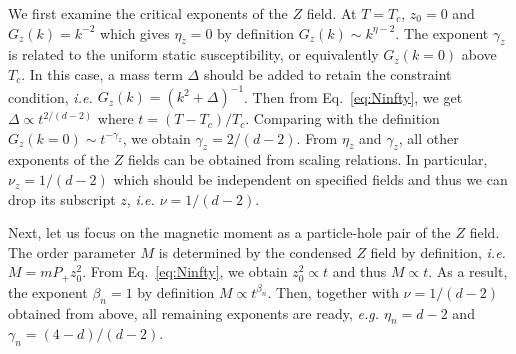 \documentclass[aps,twocolumn,superscriptaddress]{revtex4-1}
\newcommand{\ie}{\textit{i.e.{ }}}
\newcommand{\eg}{\textit{e.g.{ }}}
\begin{document}
We first examine the critical exponents of the $Z$ field. At $T=T_c$, $z_0=0$ and $G_z(k)=k^{-2}$ which gives $\eta_z=0$
by definition $G_z(k)\sim k^{\eta-2}$. The exponent $\gamma_z$ is related to the uniform static susceptibility, or
equivalently $G_z(k=0)$ above $T_c$. In this case, a mass term $\Delta$ should be added to retain the constraint
condition, \ie $G_z(k)=(k^2+\Delta)^{-1}$. Then from Eq.~\ref{eq:Ninfty}, we get $\Delta\propto t^{2/(d-2)}$ where
$t=(T-T_c)/T_c$. Comparing with the definition $G_z(k=0)\sim t^{-\gamma_z}$, we obtain $\gamma_z=2/(d-2)$. From $\eta_z$
and $\gamma_z$, all other exponents of the $Z$ fields can be obtained from scaling relations. In particular,
$\nu_z=1/(d-2)$ which should be independent on specified fields and thus we can drop its subscript $z$, \ie
$\nu=1/(d-2)$. 

Next, let us focus on the magnetic moment as a particle-hole pair of the $Z$ field. The order parameter $M$ is
determined by the condensed $Z$ field by definition, \ie $M=mP_+z_0^2$. From Eq.~\ref{eq:Ninfty}, we obtain
$z_0^2\propto t$ and thus $M\propto t$. As a result, the exponent $\beta_n=1$ by definition $M\propto t^{\beta_n}$.
Then, together with $\nu=1/(d-2)$ obtained from above, all remaining exponents are ready, \eg $\eta_n=d-2$ and
$\gamma_n=(4-d)/(d-2)$. 
\end{document}
